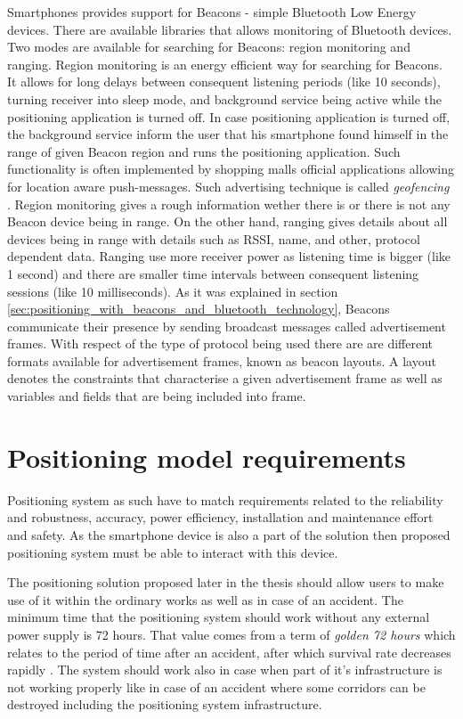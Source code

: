 \documentclass[../main.tex]{subfiles}
\begin{document}
Smartphones provides support for Beacons - simple Bluetooth Low Energy devices. There are available libraries that allows monitoring of Bluetooth devices. Two modes are available for searching for Beacons: region monitoring and ranging. Region monitoring is an energy efficient way for searching for Beacons. It allows for long delays between consequent listening periods (like 10 seconds), turning receiver into sleep mode, and background service being active while the positioning application is turned off. In case positioning application is turned off, the background service inform the user that his smartphone found himself in the range of given Beacon region and runs the positioning application. Such functionality is often implemented by shopping malls official applications allowing for location aware push-messages. Such advertising technique is called \textit{geofencing} \cite{beacon_rssi_analysis}. Region monitoring gives a rough information wether there is or there is not any Beacon device being in range. On the other hand, ranging gives details about all devices being in range with details such as RSSI, name, and other, protocol dependent data. Ranging use more receiver power as listening time is bigger (like 1 second) and there are smaller time intervals between consequent listening sessions (like 10 milliseconds). As it was explained in section \ref{sec:positioning_with_beacons_and_bluetooth_technology}, Beacons communicate their presence by sending broadcast messages called advertisement frames. With respect of the type of protocol being used there are are different formats available for advertisement frames, known as beacon layouts. A layout denotes the constraints that characterise a given advertisement frame as well as variables and fields that are being included into frame.


\section{Positioning model requirements}
Positioning system as such have to match requirements related to the reliability and robustness, accuracy, power efficiency, installation and maintenance effort and safety. As the smartphone device is also a part of the solution then proposed positioning system must be able to interact with this device.

The positioning solution proposed later in the thesis should allow users to make use of it within the ordinary works as well as in case of an accident. The minimum time that the positioning system should work without any external power supply is 72 hours. That value comes from a term of \textit{golden 72 hours} which relates to the period of time after an accident, after which survival rate decreases rapidly \cite{positioning_tests}. The system should work also in case when part of it's infrastructure is not working properly like in case of an accident where some corridors can be destroyed including the positioning system infrastructure.
\end{document}
